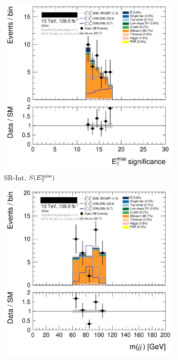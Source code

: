 \begin{figure}[tp]
\centering
\begin{subfigure}{0.48\textwidth}
\centering
\includegraphics[width=\textwidth]{figures/2ljets_def_met_Sign_SRInt.png}
\caption{SR-Int, $S(E_\mathrm{T}^\mathrm{miss})$}
\end{subfigure}
\hfill
\begin{subfigure}{0.48\textwidth}
\centering
\includegraphics[width=\textwidth]{figures/2ljets_def_mjj_SRInt.png}

\end{subfigure}
\end{figure}
